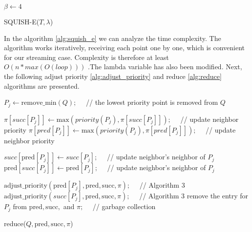 \begin{algorithm}[H]
    \DontPrintSemicolon
    $\beta \gets 4$ 
    \caption{SQUISH-E($T, \lambda$)}
    \label{alg:squish_e}
\end{algorithm}

In the algorithm \ref{alg:squish_e} we can analyze the time complexity. The algorithm works iteratively, receiving each point one by one, which is convenient for our streaming case. Complexity is therefore at least $O(n * max(O(loop) ))$ .The lambda variable has also been modified. Next, the following adjust priority \ref{alg:adjust_priority} and reduce  \ref{alg:reduce} algorithms are presented.


\begin{algorithm}[H]
    \DontPrintSemicolon

    $P_j \gets \text{remove\_min}(Q); \quad$ // the lowest priority point is removed from $Q$\;

    $\pi[succ[P_j]] \gets \text{max}(priority(P_j) , \pi[succ[P_j]]); \quad$  // update neighbor priority\;
    $\pi[pred[P_j]] \gets \text{max}(priority(P_j) , \pi[pred[P_j]]); \quad$ // update neighbor priority\;


    $succ[\text{pred}[P_j]] \gets succ[P_j]; \quad$ // update neighbor's neighbor of $P_j$ \;
    $\text{pred}[succ[P_j]] \gets \text{pred}[P_j]; \quad$ // update neighbor's neighbor of $P_j$ \;


    $\text{adjust\_priority}(\text{pred}[P_j], \text{pred}, \text{succ}, \pi); \quad$ // Algorithm 3\;
    $\text{adjust\_priority}(succ[P_j], \text{pred}, \text{succ}, \pi); \quad$ // Algorithm 3\;
    remove the entry for $P_j$ from $\text{pred}, \text{succ},$ and $\pi; \quad$ // garbage collection\;

    \caption{reduce($Q, \text{pred}, \text{succ}, \pi$)}
    \label{alg:reduce}
\end{algorithm}



